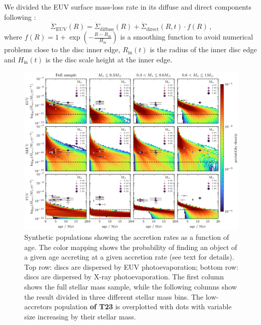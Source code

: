 \documentclass[fleqn,usenatbib]{mnras}
\begin{document}
We divided the EUV surface mass-loss rate in its diffuse and direct components following \citet{Alexander2007}:
\begin{equation}
    \dot{\Sigma}_\mathrm{EUV}(R) = \dot{\Sigma}_\mathrm{diffuse}(R) +  \dot{\Sigma}_\mathrm{direct}(R,t)\cdot f(R) \,,
\end{equation}
where $f(R) = 1+\exp{(-\frac{R-R_\mathrm{in}}{H_\mathrm{in}})}$ is a smoothing function to avoid numerical problems close to the disc inner edge, $R_\mathrm{in}(t)$ is the radius of the inner disc edge and $H_\mathrm{in}(t)$ is the disc scale height at the inner edge.
\begin{figure}
    \includegraphics{Fig62}
    \caption{Synthetic populations showing the accretion rates as a function of age. The color mapping shows the probability of finding an object of a given age accreting at a given accretion rate (see text for details). Top row: discs are dispersed by EUV photoevaporation; bottom row: discs are dispersed by X-ray photoevaporation. The first column shows the full stellar mass sample, while the following columns show the result divided in three different stellar mass bins. The low-accretors population \textbf{of T23} is overplotted with dots with variable size increasing by their stellar mass.
    \label{fig:mdot_age}}
\end{figure}
\end{document}
